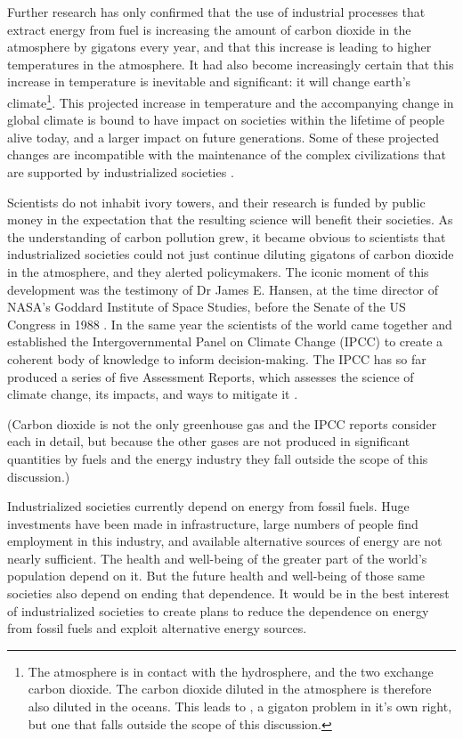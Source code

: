 Further research has only confirmed that the use of industrial processes that
extract energy from fuel is increasing the amount of carbon dioxide in the
atmosphere by gigatons every year, and that this increase is leading to higher
temperatures in the atmosphere. It had also become increasingly certain that
this increase in temperature is inevitable and significant: it will change
earth's climate\footnote{The atmosphere is in contact with the hydrosphere, and
the two exchange carbon dioxide. The carbon dioxide diluted in the atmosphere is
therefore also diluted in the oceans. This leads to , a gigaton problem in it's own right, but one that falls outside
the scope of this discussion.}. This projected increase in temperature and the
accompanying change in global climate is bound to have impact on societies
within the lifetime of people alive today, and a larger impact on future
generations. Some of these projected changes are incompatible with the
maintenance of the complex civilizations that are supported by industrialized
societies \autocite{IPCC2014}.

Scientists do not inhabit ivory towers, and their research is funded by public
money in the expectation that the resulting science will benefit their
societies. As the understanding of carbon pollution grew, it became obvious to
scientists that industrialized societies could not just continue diluting
gigatons of carbon dioxide in the atmosphere, and they alerted policymakers. The
iconic moment of this development was the testimony of Dr James E. Hansen, at
the time director of NASA's Goddard Institute of Space Studies, before the
Senate of the US Congress in 1988 \autocite{Shabecoff1988}. In the same year the
scientists of the world came together and established the Intergovernmental
Panel on Climate Change (IPCC) to create a coherent body of knowledge to inform
decision-making. The IPCC has so far produced a series of five Assessment
Reports, which assesses the science of climate change, its impacts, and ways to
mitigate it \autocite{Allen2014}.

(Carbon dioxide is not the only greenhouse gas and the IPCC reports consider
each in detail, but because the other gases are not produced in significant
quantities by fuels and the energy industry they fall outside the scope of this
discussion.)

Industrialized societies currently depend on energy from fossil fuels. Huge
investments have been made in infrastructure, large numbers of people find
employment in this industry, and available alternative sources of energy are not
nearly sufficient. The health and well-being of the greater part of the world's
population depend on it. But the future health and well-being of those same
societies also depend on ending that dependence. It would be in the best
interest of industrialized societies to create plans to reduce the dependence on
energy from fossil fuels and exploit alternative energy sources.

